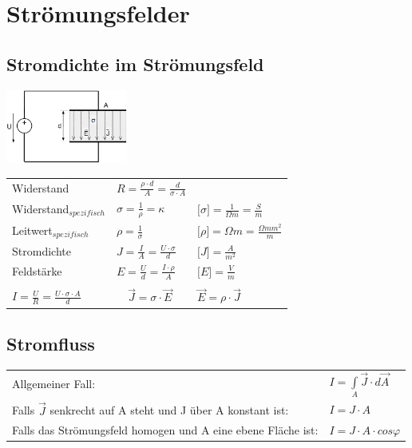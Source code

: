 \newpage
\section{Strömungsfelder}
\subsection{Stromdichte im Strömungsfeld}
\begin{multicols}{2}
\includegraphics[width=0.3\textwidth]{pics/stroemungsfeld/platten}\\

\begin{tabular}{lll}
	Widerstand&$ R = \frac{\rho \cdot d}{A} = \frac{d}{\sigma \cdot A}$&\\[5pt]
	 Widerstand$_{spezifisch}$& $ \sigma = \frac{1}{\rho} = \kappa $&$ \lbrack \sigma \rbrack = \frac{1}{\Omega m} = \frac{S}{m} $\\[5pt]
	Leitwert$_{spezifisch}$&$\rho  = \frac{1}{\sigma}$&$\lbrack \rho \rbrack = \Omega m = \frac{\Omega mm^2}{m} $\\[5pt]
Stromdichte& $ J = \frac{I}{A} = \frac{U \cdot \sigma}{d} $&$\lbrack J \rbrack =  \frac{A}{m^2} $ \\[5pt]
Feldstärke & $ E = \frac{U}{d} = \frac{I\cdot\rho}{A}$&$\lbrack E\rbrack =  \frac{V}{m} $\\
 \\
$ I = \frac{U}{R} = \frac{U \cdot \sigma \cdot A}{d} $ & $\quad \vec J = \sigma \cdot \vec E $ &$ \vec E = \rho \cdot \vec J $ \\
\end{tabular}


\end{multicols}

\subsection{Stromfluss}
\begin{tabular}{ll}
Allgemeiner Fall: & $ I = \int\limits_{A} \vec J \cdot d\vec A $ \\
Falls $ \vec J $ senkrecht auf A steht und J über A konstant ist: & $I = J \cdot A$ \\
Falls das Strömungsfeld homogen und A eine ebene Fläche ist: & $ I = J \cdot A \cdot cos \varphi $
\end{tabular}

